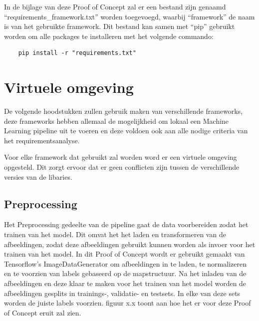 In de bijlage van deze Proof of Concept zal er een bestand zijn genaamd ``requirements\_framework.txt'' worden toegevoegd, waarbij ``framework'' de naam is van het gebruikte framework. Dit bestand kan samen met ``pip'' gebruikt worden om alle packages te installeren met het volgende commando:

\begin{verbatim}
    pip install -r "requirements.txt"
\end{verbatim}
\section{Virtuele omgeving}


De volgende hoodstukken zullen gebruik maken van verschillende frameworks, deze frameworks hebben allemaal de mogelijkheid om lokaal een Machine Learning pipeline uit te voeren en deze voldoen ook aan alle nodige criteria van het requirementsanalyse.

Voor elke framework dat gebruikt zal worden word er een virtuele omgeving opgesteld. Dit zorgt ervoor dat er geen conflicten zijn tussen de verschillende versies van de libaries.

\subsection{Preprocessing}
Het Preprocessing gedeelte van de pipeline gaat de data voorbereiden zodat het trainen van het model. Dit omvat het het laden en transformeren van de afbeeldingen, zodat deze afbeeldingen gebruikt kunnen worden als invoer voor het trainen van het model. In dit Proof of Concept wordt er gebruikt gemaakt van Tensorflow's ImageDataGenerator om afbeeldingen in te laden, te normalizeren en te voorzien van labels gebaseerd op de mapstructuur. Na het inladen van de afbeeldingen en deze klaar te maken voor het trainen van het model worden de afbeeldingen gesplits in trainings-, validatie- en testsets. In elke van deze sets worden de juiste labels voorzien. figuur x.x toont aan hoe het er voor deze Proof of Concept eruit zal zien. 
